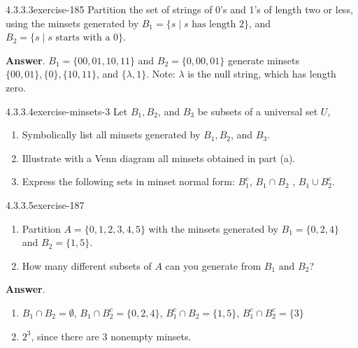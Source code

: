 \documentclass[twoside,10pt,]{book}
\numberwithin{equation}{section}
\begin{document}
\begin{divisionsolution}{4.3.3.3}{}{exercise-185}%
\hypertarget{p-1648}{}%
Partition the set of strings of 0's and 1's of length two or less, using the minsets generated by \(B_1=\{s \mid s \textrm{ has length } 2\}\), and \(B_2= \{s \mid s \textrm{ starts with a }   0\}\).%
\par\smallskip%
\noindent\textbf{Answer}.\quad%
\hypertarget{p-1649}{}%
\(B_1= \{00, 01, 10, 11\}\) and \(B_2 = \{0, 00, 01\}\) generate minsets \(\{00, 01\}, \{0\}, \{10, 11\}\), and \(\{\lambda , 1\}\). Note: \(\lambda\) is the null string, which has length zero.%
\end{divisionsolution}%
\begin{divisionsolution}{4.3.3.4}{}{exercise-minsets-3}%
\hypertarget{p-1650}{}%
Let \(B_1, B_2\), and \(B_3\) be subsets of a universal set \(U\),%
\par
\hypertarget{p-1651}{}%
\leavevmode%
\begin{enumerate}[label=(\alph*)]
\item\hypertarget{li-877}{}\hypertarget{p-1652}{}%
Symbolically list all minsets generated by \(B_1, B_2\), and \(B_3\).%
\item\hypertarget{li-878}{}\hypertarget{p-1653}{}%
Illustrate with a Venn diagram all minsets obtained in part (a).%
\item\hypertarget{li-879}{}\hypertarget{p-1654}{}%
Express the following sets in minset normal form: \(B_1^c\), \(B_1\cap B_2\) , \(B_1\cup B_2^c\).%
\end{enumerate}
%
\end{divisionsolution}%
\begin{divisionsolution}{4.3.3.5}{}{exercise-187}%
\hypertarget{p-1655}{}%
\leavevmode%
\begin{enumerate}[label=(\alph*)]
\item\hypertarget{li-880}{}\hypertarget{p-1656}{}%
Partition \(A = \{0, 1, 2, 3, 4, 5\}\) with the minsets generated by \(B_1= \{0, 2, 4\}\text{  }\)and \(B_2= \{1, 5\}\).%
\item\hypertarget{li-881}{}\hypertarget{p-1657}{}%
How many different subsets of \(A\) can you generate from  \(B_1 \textrm{ and } B_2\)?%
\end{enumerate}
%
\par\smallskip%
\noindent\textbf{Answer}.\quad%
\hypertarget{p-1658}{}%
\leavevmode%
\begin{enumerate}[label=(\alph*)]
\item\hypertarget{li-882}{}\hypertarget{p-1659}{}%
\(B_1\cap B_2=\emptyset\),  \(B_1\cap B_2^c=\{0,2,4\}\), \(B_1^c\cap B_2=\{1,5\}\), \(B_1^c\cap B_2^c=\{3\}\)%
\item\hypertarget{li-883}{}\hypertarget{p-1660}{}%
\(2^3\), since there are 3 nonempty minsets.%
\end{enumerate}
%
\end{divisionsolution}%
\end{document}
